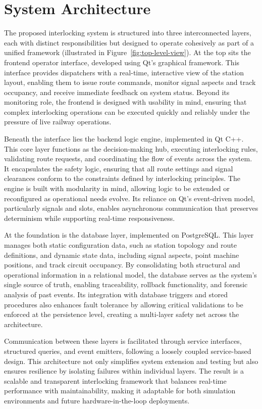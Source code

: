 \section{System Architecture}
\label{sec:system-overview:architecture}

The proposed interlocking system is structured into three interconnected layers, each with distinct responsibilities but designed to operate cohesively as part of a unified framework (illustrated in Figure~\ref{fig:top-level-view}). At the top sits the frontend operator interface, developed using Qt’s graphical framework. This interface provides dispatchers with a real-time, interactive view of the station layout, enabling them to issue route commands, monitor signal aspects and track occupancy, and receive immediate feedback on system status. Beyond its monitoring role, the frontend is designed with usability in mind, ensuring that complex interlocking operations can be executed quickly and reliably under the pressure of live railway operations.



Beneath the interface lies the backend logic engine, implemented in Qt C++. This core layer functions as the decision-making hub, executing interlocking rules, validating route requests, and coordinating the flow of events across the system. It encapsulates the safety logic, ensuring that all route settings and signal clearances conform to the constraints defined by interlocking principles. The engine is built with modularity in mind, allowing logic to be extended or reconfigured as operational needs evolve. Its reliance on Qt’s event-driven model, particularly signals and slots, enables asynchronous communication that preserves determinism while supporting real-time responsiveness.

At the foundation is the database layer, implemented on PostgreSQL. This layer manages both static configuration data, such as station topology and route definitions, and dynamic state data, including signal aspects, point machine positions, and track circuit occupancy. By consolidating both structural and operational information in a relational model, the database serves as the system’s single source of truth, enabling traceability, rollback functionality, and forensic analysis of past events. Its integration with database triggers and stored procedures also enhances fault tolerance by allowing critical validations to be enforced at the persistence level, creating a multi-layer safety net across the architecture.

Communication between these layers is facilitated through service interfaces, structured queries, and event emitters, following a loosely coupled service-based design. This architecture not only simplifies system extension and testing but also ensures resilience by isolating failures within individual layers. The result is a scalable and transparent interlocking framework that balances real-time performance with maintainability, making it adaptable for both simulation environments and future hardware-in-the-loop deployments.